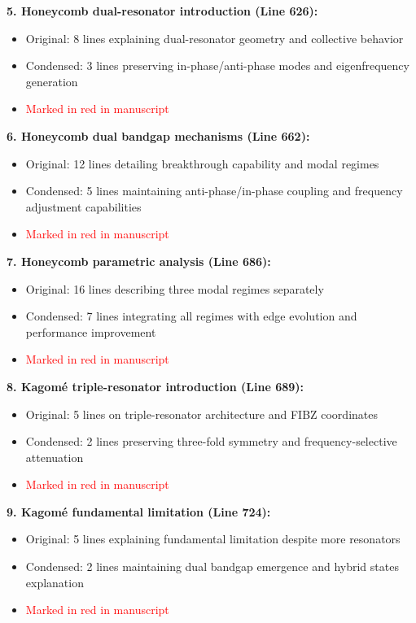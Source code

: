 \documentclass[11pt,a4paper]{article}
\newenvironment{changesbox}{%
    \par\medskip\noindent{\color{changescolor}\rule{\linewidth}{2pt}}\par
    \noindent{\color{changescolor}\bfseries Manuscript Changes}\par\smallskip
}{%
    \par\noindent{\color{changescolor}\rule{\linewidth}{0.5pt}}\medskip
}
\begin{document}
\begin{changesbox}
\textbf{5. Honeycomb dual-resonator introduction (Line 626):}
\begin{itemize}
    \item Original: 8 lines explaining dual-resonator geometry and collective behavior
    \item Condensed: 3 lines preserving in-phase/anti-phase modes and eigenfrequency generation
    \item \textcolor{red}{Marked in red in manuscript}
\end{itemize}

\textbf{6. Honeycomb dual bandgap mechanisms (Line 662):}
\begin{itemize}
    \item Original: 12 lines detailing breakthrough capability and modal regimes
    \item Condensed: 5 lines maintaining anti-phase/in-phase coupling and frequency adjustment capabilities
    \item \textcolor{red}{Marked in red in manuscript}
\end{itemize}

\textbf{7. Honeycomb parametric analysis (Line 686):}
\begin{itemize}
    \item Original: 16 lines describing three modal regimes separately
    \item Condensed: 7 lines integrating all regimes with edge evolution and performance improvement
    \item \textcolor{red}{Marked in red in manuscript}
\end{itemize}

\textbf{8. Kagomé triple-resonator introduction (Line 689):}
\begin{itemize}
    \item Original: 5 lines on triple-resonator architecture and FIBZ coordinates
    \item Condensed: 2 lines preserving three-fold symmetry and frequency-selective attenuation
    \item \textcolor{red}{Marked in red in manuscript}
\end{itemize}

\textbf{9. Kagomé fundamental limitation (Line 724):}
\begin{itemize}
    \item Original: 5 lines explaining fundamental limitation despite more resonators
    \item Condensed: 2 lines maintaining dual bandgap emergence and hybrid states explanation
    \item \textcolor{red}{Marked in red in manuscript}
\end{itemize}


\end{changesbox}
\end{document}
